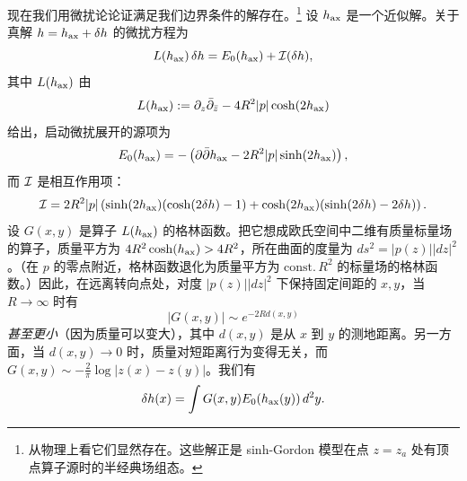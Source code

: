 现在我们用微扰论论证满足我们边界条件的解存在。\footnote{从物理上看它们显然存在。这些解正是 sinh-Gordon 模型在点 $z=z_a$ 处有顶点算子源时的半经典场组态。} 设 $h_{\rm ax}$ 是一个近似解。关于真解 $h=h_{\rm ax}+\delta h$ 的微扰方程为
\begin{equation}
L(h_{\rm ax})\,\delta h = E_0(h_{\rm ax}) + \mathcal{I}(\delta h),
\end{equation}
其中 $L(h_{\rm ax})$ 由
\begin{equation}\label{eq:L-Operator}
L(h_{\rm ax}) := \partial_z\bar\partial_{\bar z} - 4R^2|p|\cosh(2h_{\rm ax})
\end{equation}
给出，启动微扰展开的源项为
\begin{equation}
E_0(h_{\rm ax}) = -\left(\partial\bar\partial h_{\rm ax} - 2R^2|p|\sinh(2h_{\rm ax})\right),
\end{equation}
而 $\mathcal{I}$ 是相互作用项：
\begin{equation}
\mathcal{I} = 2R^2|p|\left(\sinh(2h_{\rm ax})(\cosh(2\delta h)-1) + \cosh(2h_{\rm ax})(\sinh(2\delta h)-2\delta h)\right).
\end{equation}
设 $G(x,y)$ 是算子 $L(h_{\rm ax})$ 的格林函数。把它想成欧氏空间中二维有质量标量场的算子，质量平方为 $4R^2\cosh(h_{\rm ax})>4R^2$，所在曲面的度量为 $ds^2=|p(z)||dz|^2$。（在 $p$ 的零点附近，格林函数退化为质量平方为 $\mathrm{const.}\,R^2$ 的标量场的格林函数。）因此，在远离转向点处，对度 $|p(z)||dz|^2$ 下保持固定间距的 $x,y$，当 $R\to\infty$ 时有
\begin{equation}
|G(x,y)| \sim e^{-2R d(x,y)}
\end{equation}
\emph{甚至更小}（因为质量可以变大），其中 $d(x,y)$ 是从 $x$ 到 $y$ 的测地距离。另一方面，当 $d(x,y)\to0$ 时，质量对短距离行为变得无关，而 $G(x,y)\sim-\frac{2}{\pi}\log|z(x)-z(y)|$。我们有
\begin{equation}\label{eq:FirstOrderh}
\delta h(x) = \int G(x,y)E_0(h_{\rm ax}(y))\,d^2 y.
\end{equation}

